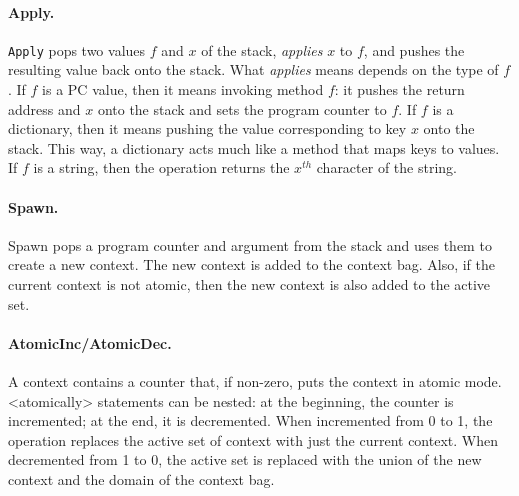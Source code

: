\documentclass[twocolumn]{article}
\begin{document}
\paragraph{Apply.}  \texttt{Apply} pops two values $f$ and $x$ of the stack,
\emph{applies} $x$ to $f$, and pushes the resulting value back onto the
stack.  What \emph{applies} means depends on the type of $f$.  If $f$ is
a PC value, then it means invoking method $f$: it pushes the return address
and $x$ onto the stack and sets the program counter to $f$.  If $f$ is a
dictionary, then it means pushing the value corresponding to key $x$ onto
the stack.  This way, a dictionary acts much like a method that maps keys
to values.  If $f$ is a string, then the operation returns the $x^{th}$
character of the string.

\paragraph{Spawn.}  Spawn pops a program counter and argument from the
stack and uses them to create a new context.  The new context is added
to the context bag.  Also, if the current context is not atomic, then
the new context is also added to the active set.

\paragraph{AtomicInc/AtomicDec.}  A context contains a counter that,
if non-zero, puts the context in atomic mode.
<{atomically}> statements can be nested: at the beginning, the
counter is incremented; at the end, it is decremented.
When incremented from 0 to 1, the operation replaces the active
set of context with just the current context.  When decremented
from 1 to 0, the active set is replaced with the union of the
new context and the domain of the context bag.
\end{document}
